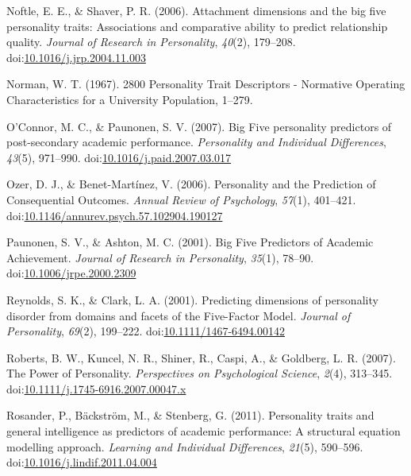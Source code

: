 \documentclass[,man,floatsintext]{apa6}
\theoremstyle{definition}
\theoremstyle{definition}
\theoremstyle{definition}
\theoremstyle{remark}
\begin{document}
\leavevmode\hypertarget{ref-Noftle2006}{}%
Noftle, E. E., \& Shaver, P. R. (2006). Attachment dimensions and the
big five personality traits: Associations and comparative ability to
predict relationship quality. \emph{Journal of Research in Personality},
\emph{40}(2), 179--208.
doi:\href{https://doi.org/10.1016/j.jrp.2004.11.003}{10.1016/j.jrp.2004.11.003}

\leavevmode\hypertarget{ref-Norman1967}{}%
Norman, W. T. (1967). 2800 Personality Trait Descriptors - Normative
Operating Characteristics for a University Population, 1--279.

\leavevmode\hypertarget{ref-OConnor2007}{}%
O'Connor, M. C., \& Paunonen, S. V. (2007). Big Five personality
predictors of post-secondary academic performance. \emph{Personality and
Individual Differences}, \emph{43}(5), 971--990.
doi:\href{https://doi.org/10.1016/j.paid.2007.03.017}{10.1016/j.paid.2007.03.017}

\leavevmode\hypertarget{ref-OzerBenet2006}{}%
Ozer, D. J., \& Benet-Martínez, V. (2006). Personality and the
Prediction of Consequential Outcomes. \emph{Annual Review of
Psychology}, \emph{57}(1), 401--421.
doi:\href{https://doi.org/10.1146/annurev.psych.57.102904.190127}{10.1146/annurev.psych.57.102904.190127}

\leavevmode\hypertarget{ref-Paunonen2001}{}%
Paunonen, S. V., \& Ashton, M. C. (2001). Big Five Predictors of
Academic Achievement. \emph{Journal of Research in Personality},
\emph{35}(1), 78--90.
doi:\href{https://doi.org/10.1006/jrpe.2000.2309}{10.1006/jrpe.2000.2309}

\leavevmode\hypertarget{ref-ClarkReynolds2001}{}%
Reynolds, S. K., \& Clark, L. A. (2001). Predicting dimensions of
personality disorder from domains and facets of the Five-Factor Model.
\emph{Journal of Personality}, \emph{69}(2), 199--222.
doi:\href{https://doi.org/10.1111/1467-6494.00142}{10.1111/1467-6494.00142}

\leavevmode\hypertarget{ref-Roberts2007a}{}%
Roberts, B. W., Kuncel, N. R., Shiner, R., Caspi, A., \& Goldberg, L. R.
(2007). The Power of Personality. \emph{Perspectives on Psychological
Science}, \emph{2}(4), 313--345.
doi:\href{https://doi.org/10.1111/j.1745-6916.2007.00047.x}{10.1111/j.1745-6916.2007.00047.x}

\leavevmode\hypertarget{ref-Rosander2011}{}%
Rosander, P., Bäckström, M., \& Stenberg, G. (2011). Personality traits
and general intelligence as predictors of academic performance: A
structural equation modelling approach. \emph{Learning and Individual
Differences}, \emph{21}(5), 590--596.
doi:\href{https://doi.org/10.1016/j.lindif.2011.04.004}{10.1016/j.lindif.2011.04.004}
\end{document}
